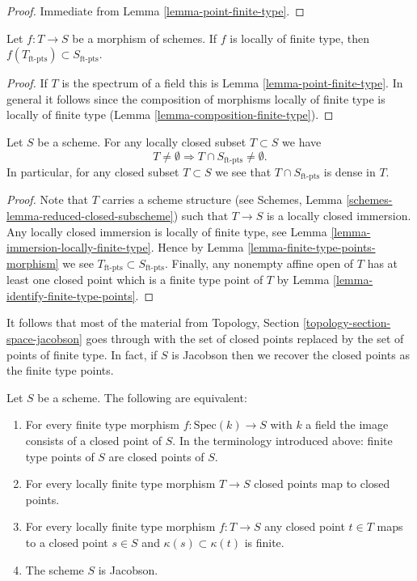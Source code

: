 \begin{proof}
Immediate from Lemma \ref{lemma-point-finite-type}.
\end{proof}

\begin{lemma}
\label{lemma-finite-type-points-morphism}
Let $f : T \to S$ be a morphism of schemes.
If $f$ is locally of finite type, then
$f(T_{\text{ft-pts}}) \subset S_{\text{ft-pts}}$.
\end{lemma}

\begin{proof}
If $T$ is the spectrum of a field this is Lemma \ref{lemma-point-finite-type}.
In general it follows since the composition of morphisms locally of finite
type is locally of finite type (Lemma \ref{lemma-composition-finite-type}).
\end{proof}


\begin{lemma}
\label{lemma-enough-finite-type-points}
Let $S$ be a scheme.
For any locally closed subset $T \subset S$ we have
$$
T \not = \emptyset
\Rightarrow
T \cap S_{\text{ft-pts}} \not = \emptyset.
$$
In particular, for any closed subset $T \subset S$ we
see that $T \cap S_{\text{ft-pts}}$ is dense in $T$.
\end{lemma}

\begin{proof}
Note that $T$ carries a scheme structure (see
Schemes, Lemma \ref{schemes-lemma-reduced-closed-subscheme})
such that $T \to S$ is a locally closed immersion.
Any locally closed immersion is locally of finite type,
see Lemma \ref{lemma-immersion-locally-finite-type}.
Hence by Lemma \ref{lemma-finite-type-points-morphism}
we see $T_{\text{ft-pts}} \subset S_{\text{ft-pts}}$.
Finally, any nonempty affine open of $T$ has at least one closed point
which is a finite type point of $T$ by
Lemma \ref{lemma-identify-finite-type-points}.
\end{proof}

\noindent
It follows that most of the material from
Topology, Section \ref{topology-section-space-jacobson} goes through
with the set of closed points replaced by the set of points of
finite type.
In fact, if $S$ is Jacobson then we recover the closed points as
the finite type points.

\begin{lemma}
\label{lemma-jacobson-finite-type-points}
Let $S$ be a scheme.
The following are equivalent:
\begin{enumerate}
\item For every finite type morphism $f : \text{Spec}(k) \to S$
with $k$ a field the image consists of a closed point of $S$.
In the terminology introduced above: finite type points of $S$ are
closed points of $S$.
\item For every locally finite type morphism $T \to S$ closed points map
to closed points.
\item For every locally finite type morphism $f : T \to S$ any closed point
$t \in T$ maps to a closed point $s \in S$ and $\kappa(s) \subset \kappa(t)$
is finite.
\item The scheme $S$ is Jacobson.
\end{enumerate}
\end{lemma}

